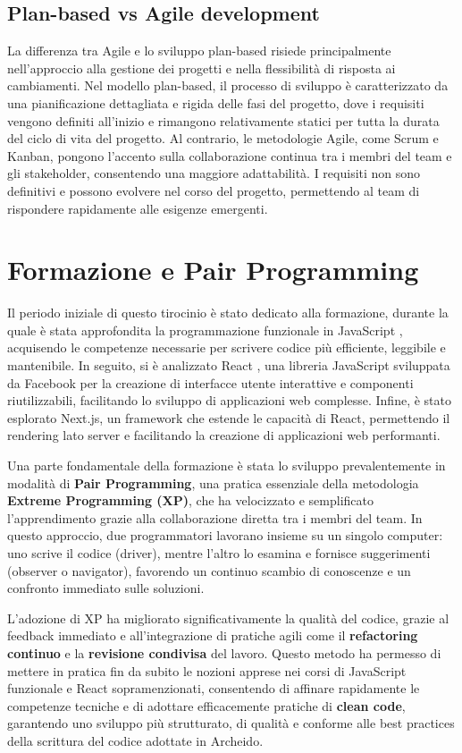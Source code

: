 \documentclass[target=bach,aauheader=,style=]{thud}
\begin{document}
\subsection{Plan-based vs Agile development}
La differenza tra Agile e lo sviluppo plan-based risiede principalmente nell'approccio alla gestione dei progetti e nella flessibilità di risposta ai cambiamenti. Nel modello plan-based, il processo di sviluppo è caratterizzato da una pianificazione dettagliata e rigida delle fasi del progetto, dove i requisiti vengono definiti all'inizio e rimangono relativamente statici per tutta la durata del ciclo di vita del progetto. Al contrario, le metodologie Agile, come Scrum e Kanban, pongono l'accento sulla collaborazione continua tra i membri del team e gli stakeholder, consentendo una maggiore adattabilità. I requisiti non sono definitivi e possono evolvere nel corso del progetto, permettendo al team di rispondere rapidamente alle esigenze emergenti.


\section{Formazione e Pair Programming}
Il periodo iniziale di questo tirocinio è stato dedicato alla formazione, durante la quale è stata approfondita la programmazione funzionale in JavaScript \cite{knowthen2024}, acquisendo le competenze necessarie per scrivere codice più efficiente, leggibile e mantenibile. In seguito, si è analizzato React \cite{udemyreactredux2024}, una libreria JavaScript sviluppata da Facebook per la creazione di interfacce utente interattive e componenti riutilizzabili, facilitando lo sviluppo di applicazioni web complesse. Infine, è stato esplorato Next.js, un framework che estende le capacità di React, permettendo il rendering lato server e facilitando la creazione di applicazioni web performanti.

\noindent Una parte fondamentale della formazione è stata lo sviluppo prevalentemente in modalità di \textbf{Pair Programming}, una pratica essenziale della metodologia \textbf{Extreme Programming (XP)}, che ha velocizzato e semplificato l'apprendimento grazie alla collaborazione diretta tra i membri del team. In questo approccio, due programmatori lavorano insieme su un singolo computer: uno scrive il codice (driver), mentre l'altro lo esamina e fornisce suggerimenti (observer o navigator), favorendo un continuo scambio di conoscenze e un confronto immediato sulle soluzioni.

\noindent L'adozione di XP ha migliorato significativamente la qualità del codice, grazie al feedback immediato e all'integrazione di pratiche agili come il \textbf{refactoring continuo} e la \textbf{revisione condivisa} del lavoro. Questo metodo ha permesso di mettere in pratica fin da subito le nozioni apprese nei corsi di JavaScript funzionale e React sopramenzionati, consentendo di affinare rapidamente le competenze tecniche e di adottare efficacemente pratiche di \textbf{clean code}, garantendo uno sviluppo più strutturato, di qualità e conforme alle best practices della scrittura del codice adottate in Archeido.
\end{document}
